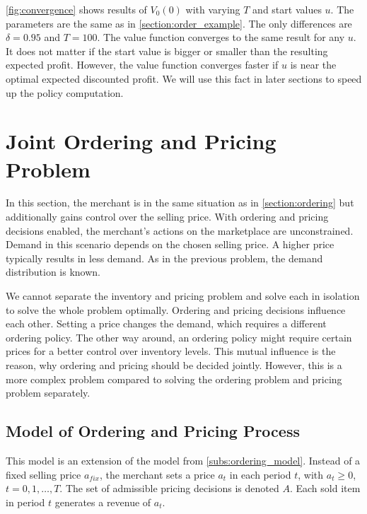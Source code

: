\cref{fig:convergence} shows results of $V_0(0)$ with varying $T$ and start values $u$.
The parameters are the same as in \cref{section:order_example}.
The only differences are $\delta = 0.95$ and $T = 100$.
The value function converges to the same result for any $u$.
It does not matter if the start value is bigger or smaller than the resulting expected profit.
However, the value function converges faster if $u$ is near the optimal expected discounted profit.
We will use this fact in later sections to speed up the policy computation.


\section{Joint Ordering and Pricing Problem}
\label{section:joint_ordering_pricing}
In this section, the merchant is in the same situation as in \cref{section:ordering} but additionally gains control over the selling price.
With ordering and pricing decisions enabled, the merchant's actions on the marketplace are unconstrained.
Demand in this scenario depends on the chosen selling price.
A higher price typically results in less demand.
As in the previous problem, the demand distribution is known.

We cannot separate the inventory and pricing problem and solve each in isolation to solve the whole problem optimally.
Ordering and pricing decisions influence each other.
Setting a price changes the demand, which requires a different ordering policy.
The other way around, an ordering policy might require certain prices for a better control over inventory levels.
This mutual influence is the reason, why ordering and pricing should be decided jointly.
However, this is a more complex problem compared to solving the ordering problem and pricing problem separately.

\subsection{Model of Ordering and Pricing Process}
\label{subs:joint_model}
This model is an extension of the model from \cref{subs:ordering_model}.
Instead of a fixed selling price $a_{fix}$, the merchant sets a price $a_t$ in each period $t$, with $a_t \geq 0$, $t=0,1,\ldots,T$.
The set of admissible pricing decisions is denoted $A$.
Each sold item in period $t$ generates a revenue of $a_t$.

